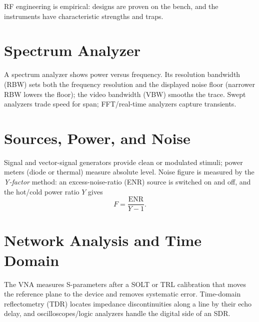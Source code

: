RF engineering is empirical: designs are proven on the bench, and the instruments
have characteristic strengths and traps.

\section{Spectrum Analyzer}
A spectrum analyzer shows power versus frequency. Its resolution bandwidth (RBW)
sets both the frequency resolution and the displayed noise floor (narrower RBW
lowers the floor); the video bandwidth (VBW) smooths the trace. Swept analyzers
trade speed for span; FFT/real-time analyzers capture transients.

\section{Sources, Power, and Noise}
Signal and vector-signal generators provide clean or modulated stimuli; power
meters (diode or thermal) measure absolute level. Noise figure is measured by the
\emph{Y-factor} method: an excess-noise-ratio (ENR) source is switched on and off,
and the hot/cold power ratio $Y$ gives
\[ F = \frac{\text{ENR}}{Y - 1}. \]

\section{Network Analysis and Time Domain}
The VNA measures S-parameters after a SOLT or TRL calibration that moves the
reference plane to the device and removes systematic error. Time-domain
reflectometry (TDR) locates impedance discontinuities along a line by their echo
delay, and oscilloscopes/logic analyzers handle the digital side of an SDR.
